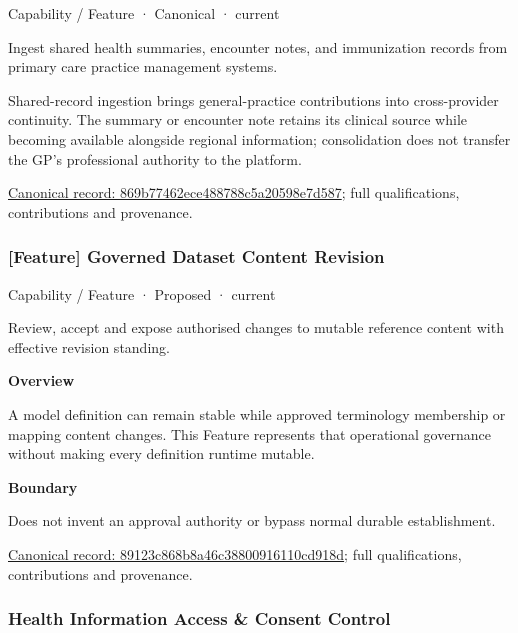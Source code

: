 \label{element:869b77462ece488788c5a20598e7d587}
{\small Capability / Feature · Canonical · current}\par

Ingest shared health summaries, encounter notes, and immunization records from primary care practice management systems.



Shared-record ingestion brings general-practice contributions into cross-provider continuity. The summary or encounter note retains its clinical source while becoming available alongside regional information; consolidation does not transfer the GP's professional authority to the platform.


{\footnotesize \href{../../../../continuum/strategy/capability/feature/869b77462ece488788c5a20598e7d587.md}{Canonical record: 869b77462ece488788c5a20598e7d587}; full qualifications, contributions and provenance.}\par
\subsubsection{[Feature] Governed Dataset Content Revision}

\label{element:89123c868b8a46c38800916110cd918d}
{\small Capability / Feature · Proposed · current}\par

Review, accept and expose authorised changes to mutable reference content with effective revision standing.



\textbf{Overview}



A model definition can remain stable while approved terminology membership or mapping content changes. This Feature represents that operational governance without making every definition runtime mutable.



\textbf{Boundary}



Does not invent an approval authority or bypass normal durable establishment.


{\footnotesize \href{../../../../continuum/strategy/capability/feature/89123c868b8a46c38800916110cd918d.md}{Canonical record: 89123c868b8a46c38800916110cd918d}; full qualifications, contributions and provenance.}\par
\subsubsection{Health Information Access \& Consent Control}

